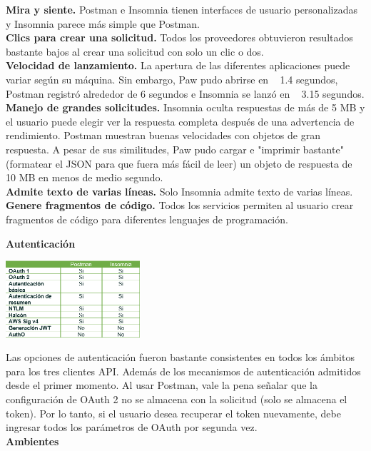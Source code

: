 \documentclass[twoside,twocolumn]{article}
\begin{document}
\textbf{Mira y siente. } Postman e Insomnia tienen interfaces de usuario personalizadas y Insomnia parece más simple que Postman.
\\\textbf{Clics para crear una solicitud. }  Todos los proveedores obtuvieron resultados bastante bajos al crear una solicitud con solo un clic o dos.
\\\textbf{Velocidad de lanzamiento.  }  La apertura de las diferentes aplicaciones puede variar según su máquina. Sin embargo, Paw pudo abrirse en ~ 1.4 segundos, Postman registró alrededor de 6 segundos e Insomnia se lanzó en ~ 3.15 segundos.
\\\textbf{Manejo de grandes solicitudes.  }  Insomnia oculta respuestas de más de 5 MB y el usuario puede elegir ver la respuesta completa después de una advertencia de rendimiento. Postman muestran buenas velocidades con objetos de gran respuesta. A pesar de sus similitudes, Paw pudo cargar e "imprimir bastante" (formatear el JSON para que fuera más fácil de leer) un objeto de respuesta de 10 MB en menos de medio segundo.
\\\textbf{Admite texto de varias líneas.  }  Solo Insomnia admite texto de varias líneas.
\\\textbf{Genere fragmentos de código.  }  Todos los servicios permiten al usuario crear fragmentos de código para diferentes lenguajes de programación.


\textbf{Autenticación}\\

\begin{center}
	\includegraphics[width=5cm]{./img/20.png} 
\end{center}

Las opciones de autenticación fueron bastante consistentes en todos los ámbitos para los tres clientes API. Además de los mecanismos de autenticación admitidos desde el primer momento.
Al usar Postman, vale la pena señalar que la configuración de OAuth 2 no se almacena con la solicitud (solo se almacena el token). Por lo tanto, si el usuario desea recuperar el token nuevamente, debe ingresar todos los parámetros de OAuth por segunda vez.
\\


\textbf{Ambientes}\\
\end{document}
